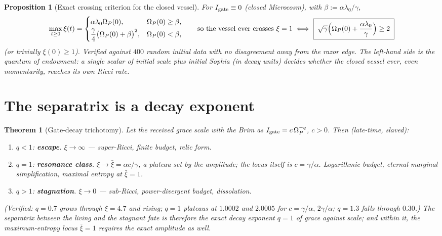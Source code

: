 \documentclass[11pt,a4paper,oneside]{book}
\newcommand{\Op}{\Omega_P}
\newcommand{\Igate}{I_{\rm gate}}
\theoremstyle{plain}
\newtheorem{proposition}{Proposition}[chapter]
\newtheorem{theorem}{Theorem}[chapter]
\theoremstyle{definition}
\theoremstyle{remark}
\begin{document}
\begin{proposition}[Exact crossing criterion for the closed vessel]\label{separatrix:prop:quantum}
For $\Igate\equiv0$ (closed Microcosm), with $\beta:=\alpha\lambda_0/\gamma$,
\begin{equation}
\max_{t\ge0}\xi(t)=
\begin{cases}
\alpha\lambda_0\Op(0), & \Op(0)\ge\beta,\\[2pt]
\dfrac{\gamma}{4}\bigl(\Op(0)+\beta\bigr)^{2}, & \Op(0)<\beta,
\end{cases}
\qquad\text{so the vessel ever crosses }\xi=1\iff
\boxed{\;\sqrt\gamma\Bigl(\Op(0)+\frac{\alpha\lambda_0}{\gamma}\Bigr)\ge2\;}
\end{equation}
(or trivially $\xi(0)\ge1$). Verified against $400$ random initial data with no disagreement away
from the razor edge. The left-hand side is the \emph{quantum of endowment}: a single scalar of
initial scale plus initial Sophia (in decay units) decides whether the closed vessel ever, even
momentarily, reaches its own Ricci rate.
\end{proposition}

\section{The separatrix is a decay exponent}

\begin{theorem}[Gate-decay trichotomy]\label{separatrix:thm:trichotomy}
Let the received grace scale with the Brim as $\Igate=c\,\Op^{-q}$, $c>0$. Then (late-time, slaved):
\begin{enumerate}[label=(\roman*),leftmargin=1.8em,itemsep=2pt]
\item $q<1$: \textbf{escape}. $\xi\to\infty$ --- super-Ricci, finite budget, relic form.
\item $q=1$: \textbf{resonance class}. $\xi\to\bar\xi=\alpha c/\gamma$, a plateau set by the
amplitude; the locus itself is $c=\gamma/\alpha$. Logarithmic budget, eternal marginal
simplification, maximal entropy at $\bar\xi=1$.
\item $q>1$: \textbf{stagnation}. $\xi\to0$ --- sub-Ricci, power-divergent budget, dissolution.
\end{enumerate}
(Verified: $q=0.7$ grows through $\xi=4.7$ and rising; $q=1$ plateaus at $1.0002$ and $2.0005$ for
$c=\gamma/\alpha,\,2\gamma/\alpha$; $q=1.3$ falls through $0.30$.) The separatrix between the living
and the stagnant fate is therefore the \emph{exact decay exponent} $q=1$ of grace against scale; and
within it, the maximum-entropy locus $\bar\xi=1$ requires the exact amplitude as well.
\end{theorem}
\end{document}
